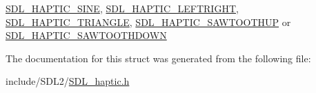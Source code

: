 \hyperlink{_s_d_l__haptic_8h_aa6d75adbfcdda5075078e7a2849da5c0}{S\+D\+L\+\_\+\+H\+A\+P\+T\+I\+C\+\_\+\+S\+I\+NE}, \hyperlink{_s_d_l__haptic_8h_ae047624d8458ff6400887c37a36f86d3}{S\+D\+L\+\_\+\+H\+A\+P\+T\+I\+C\+\_\+\+L\+E\+F\+T\+R\+I\+G\+HT}, \hyperlink{_s_d_l__haptic_8h_ae8123eaa51511507375ba6ef9220fa46}{S\+D\+L\+\_\+\+H\+A\+P\+T\+I\+C\+\_\+\+T\+R\+I\+A\+N\+G\+LE}, \hyperlink{_s_d_l__haptic_8h_ab8e3f40f3c2bcee8905d13b634363c3f}{S\+D\+L\+\_\+\+H\+A\+P\+T\+I\+C\+\_\+\+S\+A\+W\+T\+O\+O\+T\+H\+UP} or \hyperlink{_s_d_l__haptic_8h_afd64aa747034a7ccf4b55f6246525701}{S\+D\+L\+\_\+\+H\+A\+P\+T\+I\+C\+\_\+\+S\+A\+W\+T\+O\+O\+T\+H\+D\+O\+WN} 

The documentation for this struct was generated from the following file\+:\begin{DoxyCompactItemize}
\item 
include/\+S\+D\+L2/\hyperlink{_s_d_l__haptic_8h}{S\+D\+L\+\_\+haptic.\+h}\end{DoxyCompactItemize}
